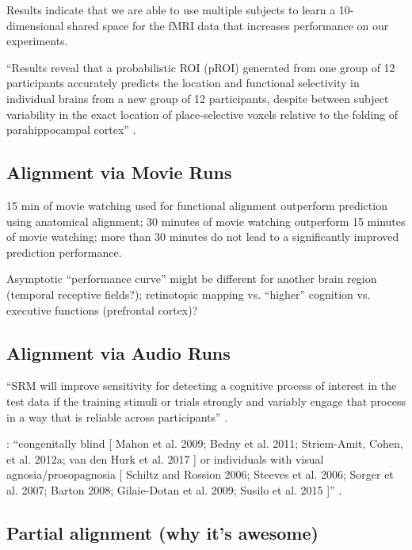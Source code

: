 %
Results indicate that we are able to use multiple subjects to learn a
10-dimensional shared space for the fMRI data that increases performance on our
experiments.

%
``Results reveal that a probabilistic ROI (pROI) generated from one group of 12
participants accurately predicts the location and functional selectivity in
individual brains from a new group of 12 participants, despite between subject
variability in the exact location of place-selective voxels relative to the
folding of parahippocampal cortex'' \citep{weiner2018defining}.


\subsection{Alignment via Movie Runs}

%
15 min of movie watching used for functional alignment outperform prediction
using anatomical alignment;
%
30 minutes of movie watching outperform 15 minutes of movie watching;
%
more than 30 minutes do not lead to a significantly improved prediction
performance.

%
Asymptotic ``performance curve'' might be different for another brain region
(temporal receptive fields?); retinotopic mapping vs. ``higher'' cognition  vs.
executive functions (prefrontal cortex)?


\subsection{Alignment via Audio Runs}

``SRM will improve sensitivity for detecting a cognitive process of interest in
the test data if the training stimuli or trials strongly and variably engage
that process in a way that is reliable across participants''
\citep{cohen2017computational}.

%
\citep{rosenke2021probabilistic}:
``congenitally blind [
    Mahon et al. 2009;
    Bedny et al. 2011;
    Striem-Amit, Cohen, et al. 2012a;
    van den Hurk et al. 2017
] or individuals with
%
visual agnosia/prosopagnosia [
    Schiltz and Rossion 2006;
    Steeves et al. 2006;
    Sorger et al. 2007;
    Barton 2008;
    Gilaie-Dotan et al. 2009;
    Susilo et al. 2015
]'' \citep{rosenke2021probabilistic}.


\subsection{Partial alignment (why it's awesome)}

